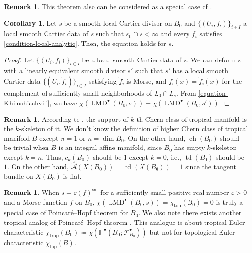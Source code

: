 \documentclass[a4paper,dvipdfmx,reqno,12pt]{amsart}
\theoremstyle{definition}
\newtheorem{corollary}[theorem]{Corollary}
\newtheorem{remark}[theorem]{Remark}
\newcommand{\deq}{\coloneqq}
\newcommand{\vep}{\varepsilon}%
\newcommand{\mb}[1]{\mathbb{#1}}%
\newcommand{\mcal}[1]{\mathcal{#1}}%
\newcommand{\opn}[1]{\operatorname{#1}}
\numberwithin{equation}{section}
\begin{document}
\begin{remark} \label{rmk: integral_mirror}
This theorem also can be considered as
a special case of \cite{MR4301560}.
\end{remark}

\begin{corollary}
Let $s$ be a smooth local Cartier divisor on $B_0$ and 
$\{(U_i,f_i)\}_{i\in I}$ a local smooth Cartier 
data of $s$ such that $s_0\cap s<\infty$ and
every $f_i$ satisfies \cref{condition-local-analytic}.
Then, the equation holds for $s$.
\end{corollary}

\begin{proof}
Let $\{(U_i,f_i)\}_{i\in I}$ be a local smooth Cartier
data of $s$. We can deform $s$ with a linearly equivalent
smooth divisor $s'$ 
such that $s'$ has a local smooth Cartier data 
$\{(U_i,\tilde{f}_i)\}_{i\in I}$ satisfying 
$\tilde{f}_i$ is Morse, and 
$f_i(x)=\tilde{f}_i(x)$ for the complement of 
sufficiently small neighborhoods of $L_0\cap L_s$. 
From \cref{equation-Khimshiashvili}, we have
$\chi(\opn{LMD}^{\bullet}(B_0,s))
=\chi(\opn{LMD}^{\bullet}(B_0,s'))$.
\end{proof}



\begin{remark}

According to \cite[5.3]{mikhalkinTropicalGeometryIts2006},
the support of $k$-th Chern class of tropical manifold is 
the $k$-skeleton of it.
We don't know the definition of higher Chern class of tropical manifold $B$ except
$n=1$ or $n=\dim B_0$. 
On the other hand, $\opn{ch}(B_0)$ should be trivial when $B$ is
an integral affine manifold, since $B_0$ has empty
$k$-skeleton except $k=n$.
Thus, $c_{k}(B_0)$ should be $1$ except $k=0$, 
i.e., $\opn{td}(B_0)$ should be $1$. 
On the other hand, $\hat{\mcal{A}}(X(B_0))=\opn{td}(X(B_0))=1$
since the tangent bundle on $X(B_0)$ is flat.
\end{remark}

\begin{remark}
When $s=\vep (f)^{\opn{sm}}$ for a sufficiently small
positive real number $\vep >0$ and 
a Morse function $f$ on $B_0$, 
$\chi(\opn{LMD}^{\bullet}(B_0,s))=
\chi_{\opn{top}}(B_0)=0$ is 
truly a special case of Poincar\'e--Hopf theorem for $B_0$.
We also note there exists another tropical analog of Poincar\'e--Hopf theorem
  \cite{rau2020tropical}. This analogue is about tropical Euler characteristic
$\chi_{\opn{trop}}(B_0)\deq 
\chi(\mb{H}^{\bullet}(B_0;\mcal{F}_{B_0}^{\bullet}))$
  but not for topological Euler characteristic $\chi_{\opn{top}}(B)$.
\end{remark}
\end{document}
